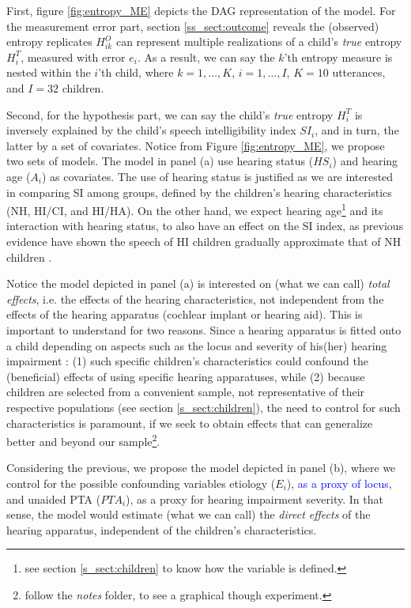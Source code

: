 First, figure \ref{fig:entropy_ME} depicts the DAG representation of the model. For the measurement error part, section \ref{ss_sect:outcome} reveals the (observed) entropy replicates $H^{O}_{ik}$ can represent multiple realizations of a child's \textit{true} entropy $H^{T}_{i}$, measured with error $e_i$. As a result, we can say the $k$'th entropy measure is nested within the $i$'th child, where $k=1, \dots, K$, $i=1, \dots, I$, $K = 10$ utterances, and $I = 32$ children.

Second, for the hypothesis part, we can say the child's \textit{true} entropy $H^{T}_{i}$ is inversely explained by the child's speech intelligibility index $SI_{i}$, and in turn, the latter by a set of covariates. Notice from Figure \ref{fig:entropy_ME}, we propose two sets of models. The model in panel (a) use hearing status ($HS_{i}$) and hearing age ($A_{i}$) as covariates. The use of hearing status is justified as we are interested in comparing SI among groups, defined by the children's hearing characteristics (NH, HI/CI, and HI/HA). On the other hand, we expect hearing age\footnote{see section \ref{s_sect:children} to know how the variable is defined.} and its interaction with hearing status, to also have an effect on the SI index, as previous evidence have shown the speech of HI children gradually approximate that of NH children \citep{Boonen_et_al_2019}.

Notice the model depicted in panel (a) is interested on (what we can call) \textit{total effects}, i.e. the effects of the hearing characteristics, not independent from the effects of the hearing apparatus (cochlear implant or hearing aid). This is important to understand for two reasons. Since a hearing apparatus is fitted onto a child depending on aspects such as the locus and severity of his(her) hearing impairment \citep{Korver_et_al_2017}: (1) such specific children's characteristics could confound the (beneficial) effects of using specific hearing apparatuses, while (2) because children are selected from a convenient sample, not representative of their respective populations (see section \ref{s_sect:children}), the need to control for such characteristics is paramount, if we seek to obtain effects that can generalize better and beyond our sample\footnote{follow the \textit{notes} folder, to see a graphical though experiment.}.

Considering the previous, we propose the model depicted in panel (b), where we control for the possible confounding variables etiology ($E_{i}$), \textcolor{blue}{as a proxy of locus}, and unaided PTA ($PTA_{i}$), as a proxy for hearing impairment severity. In that sense, the model would estimate (what we can call) the \textit{direct effects} of the hearing apparatus, independent of the children's characteristics.

